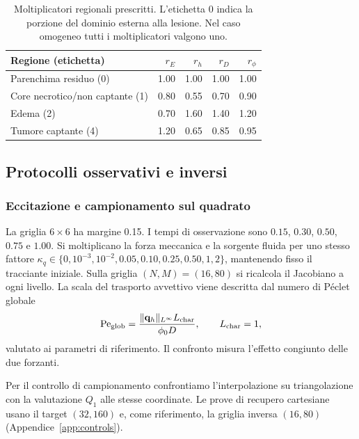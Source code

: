 \begin{table}[!tbp]
\centering
\caption{Moltiplicatori regionali prescritti. L'etichetta 0 indica la porzione del dominio esterna alla lesione. Nel caso omogeneo tutti i moltiplicatori valgono uno.}
\label{tab:pv-materials}
\small
\begin{tabular}{@{}lrrrr@{}}
\toprule
Regione (etichetta) & $r_E$ & $r_h$ & $r_D$ & $r_\phi$\\
\midrule
Parenchima residuo (0) & 1.00 & 1.00 & 1.00 & 1.00\\
Core necrotico/non captante (1) & 0.80 & 0.55 & 0.70 & 0.90\\
Edema (2) & 0.70 & 1.60 & 1.40 & 1.20\\
Tumore captante (4) & 1.20 & 0.65 & 0.85 & 0.95\\
\bottomrule
\end{tabular}
\end{table}

\subsection{Protocolli osservativi e inversi}
\label{sec:twin-protocol}

\subsubsection{Eccitazione e campionamento sul quadrato}
\label{sec:flow-sweep-method}
La griglia $6\times6$ ha margine 0.15. I tempi di osservazione sono $0.15$, $0.30$, $0.50$, $0.75$ e $1.00$. Si moltiplicano la forza meccanica e la sorgente fluida per uno stesso fattore $\kappa_q\in\{0,10^{-3},10^{-2},0.05,0.10,0.25,0.50,1,2\}$, mantenendo fisso il tracciante iniziale. Sulla griglia $(N,M)=(16,80)$ si ricalcola il Jacobiano a ogni livello. La scala del trasporto avvettivo viene descritta dal numero di Péclet globale
\begin{equation}
 \mathrm{Pe}_{\rm glob}
 =\frac{\|\mathbf q_h\|_{L^\infty}L_{\rm char}}{\phi_0D},
 \qquad L_{\rm char}=1 ,
 \label{eq:peclet-global}
\end{equation}
valutato ai parametri di riferimento. Il confronto misura l'effetto congiunto delle due forzanti.

Per il controllo di campionamento confrontiamo l'interpolazione su triangolazione con la valutazione $Q_1$ alle stesse coordinate. Le prove di recupero cartesiane usano il target $(32,160)$ e, come riferimento, la griglia inversa $(16,80)$ (Appendice~\ref{app:controls}).

